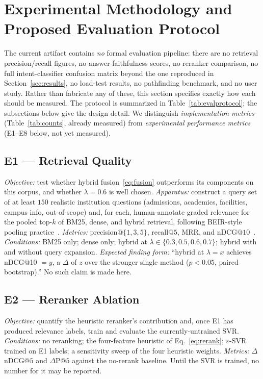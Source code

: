 \section{Experimental Methodology and Proposed Evaluation Protocol}
\label{sec:eval}


The current artifact contains \emph{no} formal evaluation pipeline: there
are no retrieval precision/recall figures, no answer-faithfulness scores,
no reranker comparison, no full intent-classifier confusion matrix beyond
the one reproduced in Section~\ref{sec:results}, no load-test results, no
pathfinding benchmark, and no user study. Rather than fabricate any of
these, this section specifies exactly how each should be measured. The
protocol is summarized in Table~\ref{tab:evalprotocol}; the subsections
below give the design detail. We distinguish \emph{implementation metrics}
(Table~\ref{tab:counts}, already measured) from \emph{experimental
performance metrics} (E1--E8 below, not yet measured).

\subsection{E1 --- Retrieval Quality}
\emph{Objective:} test whether hybrid fusion~\eqref{eq:fusion} outperforms
its components on this corpus, and whether $\lambda = 0.6$ is well chosen.
\emph{Apparatus:} construct a query set of at least $150$ realistic
institution questions (admissions, academics, facilities, campus info,
out-of-scope) and, for each, human-annotate graded relevance for the pooled
top-$k$ of BM25, dense, and hybrid retrieval, following BEIR-style pooling
practice~\cite{thakur2021beir}. \emph{Metrics:} precision@$\{1,3,5\}$,
recall@$5$, MRR, and nDCG@$10$~\cite{jarvelin2002ndcg}. \emph{Conditions:}
BM25 only; dense only; hybrid at
$\lambda \in \{0.3, 0.5, 0.6, 0.7\}$; hybrid with and without query
expansion. \emph{Expected finding form:} ``hybrid at $\lambda=x$ achieves
nDCG@10 $= y$, a $\Delta$ of $z$ over the stronger single method
($p < 0.05$, paired bootstrap).'' No such claim is made here.

\subsection{E2 --- Reranker Ablation}
\emph{Objective:} quantify the heuristic reranker's contribution and, once
E1 has produced relevance labels, train and evaluate the currently-untrained
SVR. \emph{Conditions:} no reranking; the four-feature heuristic of
Eq.~\eqref{eq:rerank}; $\varepsilon$-SVR trained on E1 labels; a sensitivity
sweep of the four heuristic weights. \emph{Metrics:} $\Delta$nDCG@$5$ and
$\Delta$P@$5$ against the no-rerank baseline. Until the SVR is trained, no
number for it may be reported.

